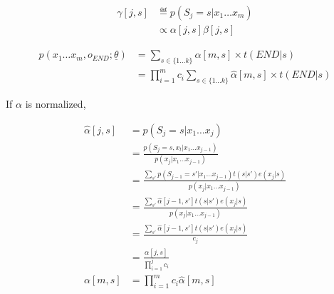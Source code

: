 \begin{align}
\gamma[j, s]&\eqdef p(S_j = s | x_1\ldots x_m) \\
  &\propto \alpha[j, s]\beta[j, s]
\end{align}

\begin{align}
p(x_1\ldots x_m, o_{END}; \underline{\theta}) &= \sum_{s\in \{1\ldots k\}}\alpha[m, s]\times t(END|s) \\
    &= \prod_{i = 1}^m c_i \sum_{s\in \{1\ldots k\}}\hat{\alpha}[m, s]\times t(END|s)
\end{align}

If $\alpha$ is normalized, 

\begin{align}
\hat{\alpha}[j, s] &= p(S_j = s | x_1\ldots x_j) \\
    &= \frac{p(S_j = s, x_t | x_1\ldots x_{j-1})}{p(x_j|x_1\ldots x_{j - 1})} \\
    &= \frac{\sum_{s'} p(S_{j-1} = s'| x_1\ldots x_{j-1})t(s|s')e(x_j|s)}{p(x_j|x_1\ldots x_{j - 1})} \\
    &= \frac{\sum_{s'} \hat{\alpha}[j-1, s']t(s|s')e(x_j|s)}{p(x_j|x_1\ldots x_{j - 1})} \\
    &= \frac{\sum_{s'} \hat{\alpha}[j-1, s']t(s|s')e(x_j|s)}{c_j} \\
    & = \frac{\alpha[j, s]}{\prod_{i = 1}^j c_i} \\
\alpha[m, s] &= \prod_{i = 1}^m c_i \hat{\alpha}[m, s]
\end{align}

\clearpage
\newpage
